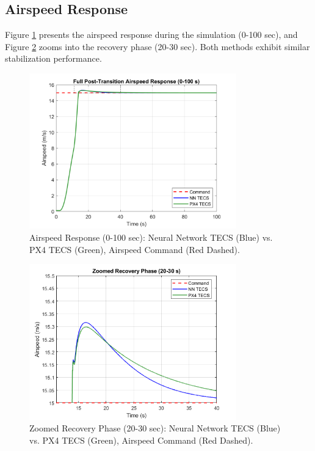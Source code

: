 \documentclass[journal,article,submit,pdftex,moreauthors]{Definitions/mdpi}
\begin{document}
\subsection{Airspeed Response}
Figure \ref{fig:full_airspeed} presents the airspeed response during the simulation (0-100 sec), and Figure \ref{fig:zoomed_airspeed} zooms into the recovery phase (20-30 sec). Both methods exhibit similar stabilization performance.

\begin{figure}[H]
    \centering
    \includegraphics[width=0.8\textwidth]{full_airspeed_plot.png}
    \caption{Airspeed Response (0-100 sec): Neural Network TECS (Blue) vs. PX4 TECS (Green), Airspeed Command (Red Dashed).}
    \label{fig:full_airspeed}
\end{figure}

\begin{figure}[H]
    \centering
    \includegraphics[width=0.8\textwidth]{zoomed_airspeed_plot.png}
    \caption{Zoomed Recovery Phase (20-30 sec): Neural Network TECS (Blue) vs. PX4 TECS (Green), Airspeed Command (Red Dashed).}
    \label{fig:zoomed_airspeed}
\end{figure}
\end{document}
